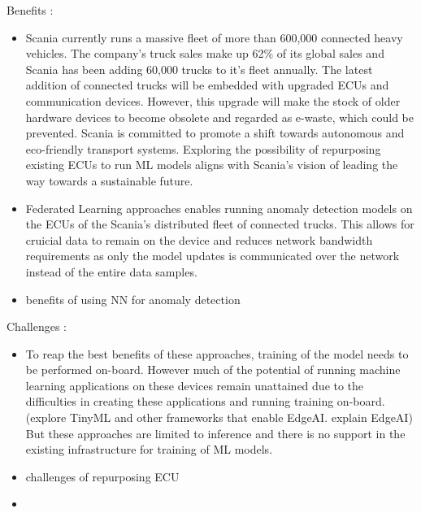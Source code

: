 Benefits :
\begin{itemize}
	\item Scania currently runs a massive fleet of more than 600,000 connected heavy vehicles. The company's truck sales make up 62\% of its global sales and Scania has been adding 60,000 trucks to it's fleet annually. The latest addition of connected trucks will be embedded with upgraded ECUs and communication devices. However, this upgrade will make the stock of older hardware devices to become obsolete and regarded as e-waste, which could be prevented. Scania is committed to promote a shift towards autonomous and eco-friendly transport systems. Exploring the possibility of repurposing existing ECUs to run ML models aligns with Scania's vision of leading the way towards a sustainable future. 
	\item Federated Learning approaches enables running anomaly detection models on the ECUs of the Scania's distributed fleet of connected trucks. This allows for cruicial data to remain on the device and reduces network bandwidth requirements as only the model updates is communicated over the network instead of the entire data samples. 
	\item benefits of using NN for anomaly detection
\end{itemize}

Challenges :
\begin{itemize}
	\item To reap the best benefits of these approaches, training of the model needs to be performed on-board. However much of the potential of running machine learning applications on these devices remain unattained due to the difficulties in creating these applications and running training on-board.(explore TinyML and other frameworks that enable EdgeAI. explain EdgeAI)
	But these approaches are limited to inference and there is no support in the existing infrastructure for training of ML models.
	\item challenges of repurposing ECU
	\item 
\end{itemize}


